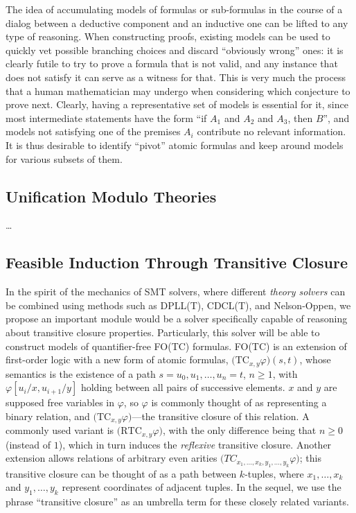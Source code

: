 The idea of accumulating models of formulas or sub-formulas in the course of
a dialog between a deductive component and an inductive one can be lifted to
any type of reasoning.
When constructing proofs, existing models can be used to quickly vet possible
branching choices and discard ``obviously wrong'' ones: it is clearly futile
to try to prove a formula that is not valid, and any instance that does not
satisfy it can serve as a witness for that.
This is very much the process that a human mathematician may undergo when
considering which conjecture to prove next.
Clearly, having a representative set of models is essential for it, since
most intermediate statements have the form ``if $A_1$ and $A_2$ and $A_3$, then
$B$'', and models not satisfying one of the premises $A_i$ contribute no
relevant information.
It is thus desirable to identify ``pivot'' atomic formulas and keep around
models for various subsets of them.


\subsection{Unification Modulo Theories}

\ldots

\subsection{Feasible Induction Through Transitive Closure}

In the spirit of the mechanics of SMT solvers, where different \emph{theory solvers}
can be combined using methods such as DPLL(T), CDCL(T), and Nelson-Oppen, we
propose an important module would be a solver specifically capable of reasoning
about transitive closure properties.
Particularly, this solver will be able to construct models of quantifier-free
FO(TC) formulas.
FO(TC) is an extension of first-order logic with a new form of atomic formulas, $\big(\mathrm{TC}_{x,y}\varphi\big)(s,t)$,
whose semantics is the existence of a path $s=u_0,u_1,\ldots,u_n=t$, $n\geq 1$, with $\varphi[u_i/x,u_{i+1}/y]$
holding between all pairs of successive elements.
$x$ and $y$ are supposed free variables in $\varphi$, so $\varphi$ is commonly thought of as representing a binary relation, and $\big(\mathrm{TC}_{x,y}\varphi\big)$---the transitive closure of this relation.
A commonly used variant is $\big(\mathrm{RTC}_{x,y}\varphi\big)$, with the only difference being that $n\geq 0$ (instead of $1$),
which in turn induces the \emph{reflexive} transitive closure.
Another extension allows relations of arbitrary even arities
$\big(TC_{x_1,\ldots,x_k,y_1,\ldots,y_k}\varphi\big)$;
this transitive closure can be thought of as a path between $k$-tuples, where $x_1,\ldots,x_k$ and $y_1,\ldots,y_k$ represent coordinates of adjacent tuples.
In the sequel, we use the phrase ``transitive closure'' as an umbrella term for these closely related variants.

